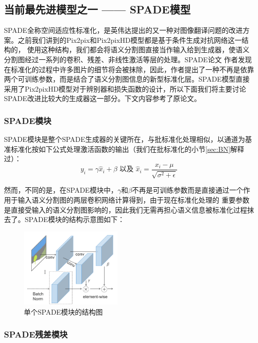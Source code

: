 \documentclass[supercite]{HustGraduPaper}
\theoremstyle{definition}
\begin{document}
\subsection{当前最先进模型之一 —— SPADE模型}

SPADE全称空间适应性标准化，是英伟达提出的又一种对图像翻译问题的改进方案。之前我们讲到的Pix2pix和Pix2pixHD模型都是基于条件生成对抗网络这一结构的，
使用这种结构，我们都会将语义分割图直接当作输入给到生成器，使语义分割图经过一系列的卷积、残差、非线性激活等层的处理。SPADE论文\cite{park2019SPADE}
作者发现在标准化的过程中许多图片的细节将会被抹除，因此，作者提出了一种不再是依靠两个可训练参数，而是结合了语义分割图信息的新型标准化层。SPADE模型直接
采用了Pix2pixHD模型对于辨别器和损失函数的设计，所以下面我们将主要讨论SPADE改进比较大的生成器这一部分。下文内容参考了原论文\cite{park2019SPADE}。

\subsubsection{SPADE模块}

SPADE模块是整个SPADE生成器的关键所在，与批标准化处理相似，以通道为基准标准化按如下公式处理激活函数的输出（我们在批标准化的小节\ref{sec:BN}解释过）：
$$y_{i}=\gamma \hat{x}_{i}+\beta \text { 以及 } \hat{x}_{i}=\frac{x_{i}-\mu}{\sqrt{\sigma^{2}+\epsilon}}$$

然而，不同的是，在SPADE模块中，$\gamma$和$\beta$不再是可训练参数而是直接通过一个作用于输入语义分割图的两层卷积网络计算得到，由于现在标准化处理的
重要参数是直接受输入的语义分割图影响的，因此我们无需再担心语义信息被标准化过程抹去了。SPADE模块的结构示意图如下：
\begin{figure}[H]
  \begin{center}
  \includegraphics[width=5cm]{images/SPADE-Block}
  \end{center}
  \caption{单个SPADE模块的结构图}
  \label{fig:SPADE-Block}
\end{figure}

\subsubsection{SPADE残差模块}
\end{document}
